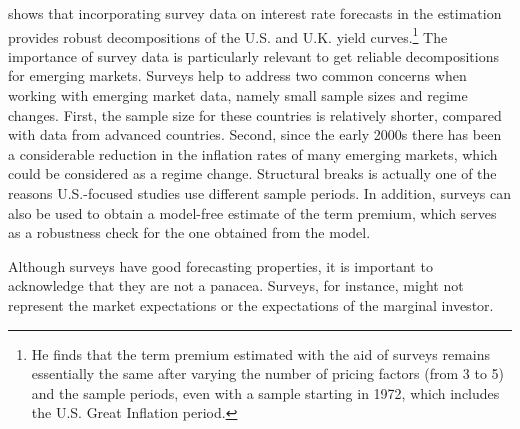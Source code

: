 {\cite{Guimaraes:2014} shows that incorporating survey data on interest rate forecasts in the estimation provides robust decompositions of the U.S. and U.K. yield curves.\footnote{ He finds that the term premium estimated with the aid of surveys remains essentially the same after varying the number of pricing factors (from 3 to 5) and the sample periods, even with a sample starting in 1972, which includes the U.S. Great Inflation period.} 
The importance of survey data is particularly relevant to get reliable decompositions for emerging markets. %
Surveys help to address two common concerns when working with emerging market data, namely small sample sizes and regime changes.
First, the sample size for these countries is relatively shorter, compared with data from advanced countries.
Second, since the early 2000s there has been a considerable reduction in the inflation rates of many emerging markets, which %
could be considered as a regime change. 
Structural breaks is actually one of the reasons U.S.-focused studies use different sample periods.
In addition,
 surveys can also be used to obtain a model-free estimate of the term premium, which
serves as a robustness check for the one obtained from the model.

Although surveys have good forecasting properties, it is important to acknowledge that they are not a panacea. Surveys, for instance, might not represent the market expectations or the expectations of the marginal investor.

}
